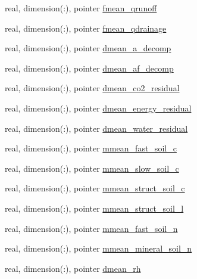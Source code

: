 \begin{DoxyCompactItemize}
\item 
real, dimension(\+:), pointer \hyperlink{structed__state__vars_1_1sitetype_a5e3e032c2734302a4883b135b532efeb}{fmean\+\_\+qrunoff}
\item 
real, dimension(\+:), pointer \hyperlink{structed__state__vars_1_1sitetype_a52f3734a51387289df60c06db57e769f}{fmean\+\_\+qdrainage}
\item 
real, dimension(\+:), pointer \hyperlink{structed__state__vars_1_1sitetype_a39e11b959f21ca1eb961928c6f0c219c}{dmean\+\_\+a\+\_\+decomp}
\item 
real, dimension(\+:), pointer \hyperlink{structed__state__vars_1_1sitetype_af505462a33baba6b5be95c3f95f7df0f}{dmean\+\_\+af\+\_\+decomp}
\item 
real, dimension(\+:), pointer \hyperlink{structed__state__vars_1_1sitetype_adf33217d113da641cd6f07866236b206}{dmean\+\_\+co2\+\_\+residual}
\item 
real, dimension(\+:), pointer \hyperlink{structed__state__vars_1_1sitetype_aa6e5f4e2be30994d0c5df534c001728c}{dmean\+\_\+energy\+\_\+residual}
\item 
real, dimension(\+:), pointer \hyperlink{structed__state__vars_1_1sitetype_ac36b2b62c7104eaddfbc3390249b24ec}{dmean\+\_\+water\+\_\+residual}
\item 
real, dimension(\+:), pointer \hyperlink{structed__state__vars_1_1sitetype_a5db7e62dd3d38c115944a30dac9e1065}{mmean\+\_\+fast\+\_\+soil\+\_\+c}
\item 
real, dimension(\+:), pointer \hyperlink{structed__state__vars_1_1sitetype_ae49eed8df9955921a90cf56aa5dcd467}{mmean\+\_\+slow\+\_\+soil\+\_\+c}
\item 
real, dimension(\+:), pointer \hyperlink{structed__state__vars_1_1sitetype_aa0ea67f8775070286054b0e77051a213}{mmean\+\_\+struct\+\_\+soil\+\_\+c}
\item 
real, dimension(\+:), pointer \hyperlink{structed__state__vars_1_1sitetype_a39dbf050cc1a4f56fca8a9bc8f866d54}{mmean\+\_\+struct\+\_\+soil\+\_\+l}
\item 
real, dimension(\+:), pointer \hyperlink{structed__state__vars_1_1sitetype_a099af2135495c03b4e2a25127c1d699d}{mmean\+\_\+fast\+\_\+soil\+\_\+n}
\item 
real, dimension(\+:), pointer \hyperlink{structed__state__vars_1_1sitetype_a3a361b9c29f454c291bc74321c6e68d5}{mmean\+\_\+mineral\+\_\+soil\+\_\+n}
\item 
real, dimension(\+:), pointer \hyperlink{structed__state__vars_1_1sitetype_a1c33fd476ea53d89967ad6f63ea4c924}{dmean\+\_\+rh}

\end{DoxyCompactItemize}
